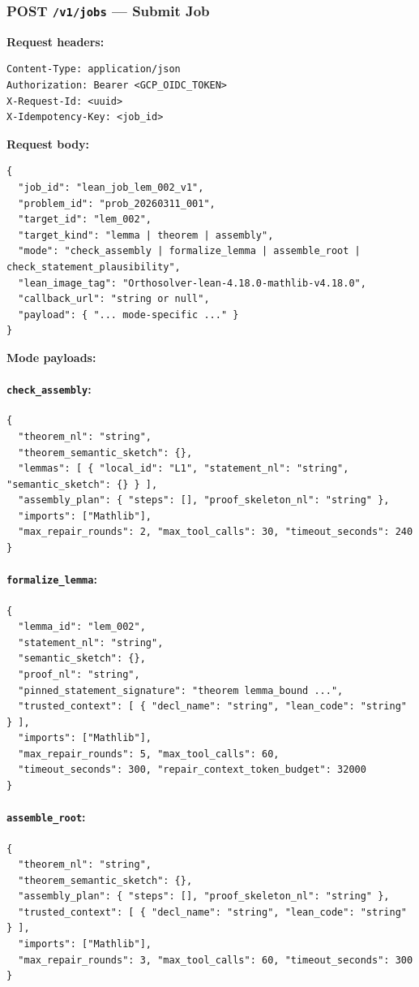 \documentclass[11pt,a4paper]{article}
\begin{document}
\subsubsection{POST \texttt{/v1/jobs} --- Submit Job}

\textbf{Request headers:}
\begin{lstlisting}
Content-Type: application/json
Authorization: Bearer <GCP_OIDC_TOKEN>
X-Request-Id: <uuid>
X-Idempotency-Key: <job_id>
\end{lstlisting}

\textbf{Request body:}
\begin{lstlisting}
{
  "job_id": "lean_job_lem_002_v1",
  "problem_id": "prob_20260311_001",
  "target_id": "lem_002",
  "target_kind": "lemma | theorem | assembly",
  "mode": "check_assembly | formalize_lemma | assemble_root | check_statement_plausibility",
  "lean_image_tag": "Orthosolver-lean-4.18.0-mathlib-v4.18.0",
  "callback_url": "string or null",
  "payload": { "... mode-specific ..." }
}
\end{lstlisting}

\textbf{Mode payloads:}

\paragraph{\texttt{check\_assembly}:}
\begin{lstlisting}
{
  "theorem_nl": "string",
  "theorem_semantic_sketch": {},
  "lemmas": [ { "local_id": "L1", "statement_nl": "string", "semantic_sketch": {} } ],
  "assembly_plan": { "steps": [], "proof_skeleton_nl": "string" },
  "imports": ["Mathlib"],
  "max_repair_rounds": 2, "max_tool_calls": 30, "timeout_seconds": 240
}
\end{lstlisting}

\paragraph{\texttt{formalize\_lemma}:}
\begin{lstlisting}
{
  "lemma_id": "lem_002",
  "statement_nl": "string",
  "semantic_sketch": {},
  "proof_nl": "string",
  "pinned_statement_signature": "theorem lemma_bound ...",
  "trusted_context": [ { "decl_name": "string", "lean_code": "string" } ],
  "imports": ["Mathlib"],
  "max_repair_rounds": 5, "max_tool_calls": 60,
  "timeout_seconds": 300, "repair_context_token_budget": 32000
}
\end{lstlisting}

\paragraph{\texttt{assemble\_root}:}
\begin{lstlisting}
{
  "theorem_nl": "string",
  "theorem_semantic_sketch": {},
  "assembly_plan": { "steps": [], "proof_skeleton_nl": "string" },
  "trusted_context": [ { "decl_name": "string", "lean_code": "string" } ],
  "imports": ["Mathlib"],
  "max_repair_rounds": 3, "max_tool_calls": 60, "timeout_seconds": 300
}
\end{lstlisting}
\end{document}
